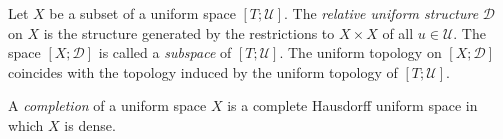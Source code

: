 Let $X$ be a subset of a uniform space $[T; \mathcal{U}]$. The \textit{relative uniform structure} $\mathcal{D}$ on $X$ is the structure generated by the restrictions to $X \times X$ of all $u \in \mathcal{U}$. The space $[X; \mathcal{D}]$ is called a \textit{subspace} of $[T; \mathcal{U}]$. The uniform topology on $[X; \mathcal{D}]$ coincides with the topology induced by the uniform topology of $[T; \mathcal{U}]$.

A \textit{completion} of a uniform space $X$ is a complete Hausdorff uniform space in which $X$ is dense.
